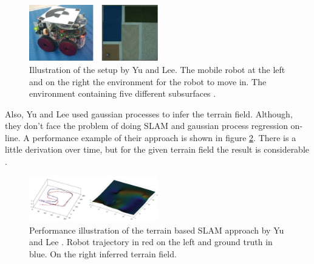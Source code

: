 \begin{figure}[h!]
	\centering
	\includegraphics[width=0.5\textwidth]{images/yu_setup.png}
	\caption{
        Illustration of the setup by Yu and Lee. The mobile robot at the left and
        on the right the environment for the robot to move in. The environment containing
        five different subsurfaces \cite{yu_terrain_2018}.
        }
	\label{fig:yu_setup}
\end{figure}

Also, Yu and Lee used gaussian processes to infer the terrain field. Although, they don't face the
problem of doing SLAM and gaussian process regression on-line. A performance example of their approach
is shown in figure \ref{fig:yu_performance}. There is a little derivation over time, but
for the given terrain field the result is considerable \cite{yu_terrain_2018}.

\begin{figure}[h!]
	\centering
	\includegraphics[width=0.5\textwidth]{images/yu_performance.png}
	\caption{
        Performance illustration of the terrain based SLAM approach by Yu and Lee \cite{yu_terrain_2018}.
        Robot trajectory in red on the left and ground truth in blue. On the right inferred terrain field.
        }
	\label{fig:yu_performance}
\end{figure}

